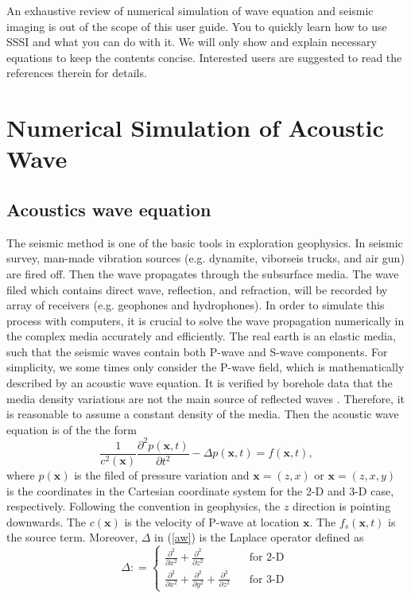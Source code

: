 \documentclass[11pt]{article}
\newcommand{\bx}{\boldsymbol{x}}
\theoremstyle{plain}
\theoremstyle{definition}
\theoremstyle{remark}
\numberwithin{equation}{section}
\begin{document}
An exhaustive review of numerical simulation of wave equation and seismic imaging is out of the scope of this user guide. 
You to quickly learn how to use SSSI and what you can do with it. We will only show and explain necessary 
equations to keep the contents concise. Interested users are suggested to read the references therein for details.  


\section{Numerical Simulation of Acoustic Wave}
\subsection{Acoustics wave equation}
The seismic method is one of the basic tools in exploration geophysics. In seismic survey, man-made vibration sources (e.g. dynamite, viborseis trucks, and air gun) are fired off. Then the wave propagates through the subsurface media. The wave filed which contains direct wave, reflection, and refraction, will be recorded by array of receivers (e.g. geophones and hydrophones). In order to simulate this process with computers, it is crucial to solve the wave propagation numerically in the complex media accurately and efficiently. The real earth is an elastic media, such that the seismic waves contain both P-wave and S-wave components. For simplicity, we some times only consider the P-wave field, which is mathematically described by an acoustic wave equation. It is verified by borehole data that the media density variations are not the main source of reflected waves \cite{Hoo1981}. Therefore, it is reasonable to assume a constant density of the media. Then the acoustic wave equation is of the the form  
\begin{equation}\label{aw}
\frac{1}{c^2(\bx)}\frac{\partial^2 p(\bx,t)}{\partial t^2}-\Delta p(\bx,t)=f(\bx,t),
\end{equation}
where $p(\bx)$ is the filed of pressure variation and $\bx=(z,x)$ or $\bx=(z,x,y)$ is the coordinates in the Cartesian coordinate system for the 2-D and 3-D case, respectively. Following the convention in geophysics, the $z$ direction is pointing downwards. The $c(\bx)$ is the velocity of P-wave at location $\bx$. The $f_s(\bx,t)$ is the source term. Moreover, $\Delta$ in (\ref{aw}) is the Laplace operator defined as 
\begin{equation}
\Delta: =\left\{
\begin{aligned}
\frac{\partial^2}{\partial x^2}+\frac{\partial^2}{\partial z^2}~~~~~~~ & ~~~~\text{for 2-D }\\
\frac{\partial^2}{\partial x^2}+\frac{\partial^2}{\partial y^2}+\frac{\partial^2}{\partial z^2} &~~~~ \text{for 3-D}
\end{aligned}
\right.  
\end{equation}
\end{document}
